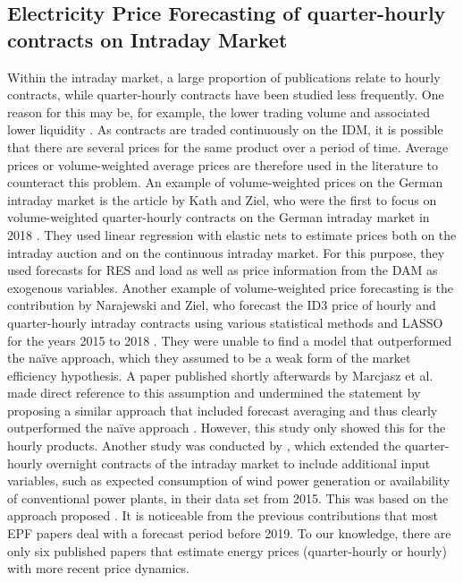 \documentclass[preprint,12pt,nonatbib]{elsarticle}
\begin{document}
\subsection{Electricity Price Forecasting of quarter-hourly contracts on Intraday Market}
Within the intraday market, a large proportion of publications relate to hourly contracts, while quarter-hourly contracts have been studied less frequently. One reason for this may be, for example, the lower trading volume and associated lower liquidity \cite{Marcjasz.2023b}.
As contracts are traded continuously on the IDM, it is possible that there are several prices for the same product over a period of time. Average prices or volume-weighted average prices are therefore used in the literature to counteract this problem.
An example of volume-weighted prices on the German intraday market is the article by Kath and Ziel, who were the first to focus on volume-weighted quarter-hourly contracts on the German intraday market in 2018 \cite{Kath.2018}.
They used linear regression with elastic nets to estimate prices both on the intraday auction and on the continuous intraday market. For this purpose, they used forecasts for RES and load as well as price information from the DAM as exogenous variables.
Another example of volume-weighted price forecasting is the contribution by Narajewski and Ziel, who forecast the ID3 price of hourly and quarter-hourly intraday contracts using various statistical methods and LASSO for the years 2015 to 2018 \cite{Narajewski.2020}.
They were unable to find a model that outperformed the naïve approach, which they assumed to be a weak form of the market efficiency hypothesis. 
A paper published shortly afterwards by Marcjasz et al. made direct reference to this assumption and undermined the statement by proposing a similar approach that included forecast averaging and thus clearly outperformed the naïve approach \cite{Marcjasz.2020}.
However, this study only showed this for the hourly products.
Another study was conducted by \cite{Kremer.2020}, which extended the quarter-hourly overnight contracts of the intraday market to include additional input variables, such as expected consumption of wind power generation or availability of conventional power plants, in their data set from 2015.
This was based on the approach proposed \cite{Narajewski.2020}.
It is noticeable from the previous contributions that most EPF papers deal with a forecast period before 2019.
To our knowledge, there are only six published papers that estimate energy prices (quarter-hourly or hourly) with more recent price dynamics.
\end{document}
